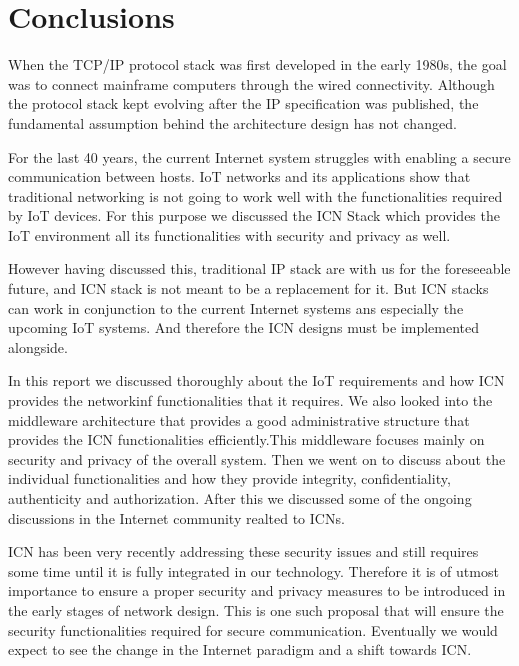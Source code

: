 \section{Conclusions}
When the TCP/IP protocol stack was first developed in the early 1980s, the goal was to connect mainframe computers through the wired connectivity. Although the protocol stack kept evolving after the IP specification was published, the fundamental assumption behind the architecture design has not changed.\par
For the last 40 years, the current Internet system struggles with enabling a secure communication between hosts.
IoT networks and its applications show that traditional networking is not going to work well with the functionalities required by IoT devices. For this purpose we discussed the ICN Stack which provides the IoT environment all its functionalities with security and privacy as well. \par
However having discussed this, traditional IP stack are with us for the foreseeable future, and ICN stack is not meant to be a replacement for it. But ICN stacks can work in conjunction to the current Internet systems ans especially the upcoming IoT systems. And therefore the ICN designs must be implemented alongside.\par 
In this report we discussed thoroughly about the IoT requirements and how ICN provides the networkinf functionalities that it requires. We also looked into the middleware architecture that provides a good administrative structure that provides the ICN functionalities efficiently.This middleware focuses mainly on security and privacy of the overall system. Then we went on to discuss about the individual functionalities and how they provide integrity, confidentiality, authenticity and authorization. After this we discussed some of the ongoing discussions in the Internet community realted to ICNs. \par
ICN has been very recently addressing these security issues and still requires some time until it is fully integrated in our technology. Therefore it is of utmost importance to ensure a proper security and privacy measures to be introduced in the early stages of network design. This is one such proposal that will ensure the security functionalities required for secure communication. Eventually we would expect to see the change in the Internet paradigm and a shift towards ICN.
